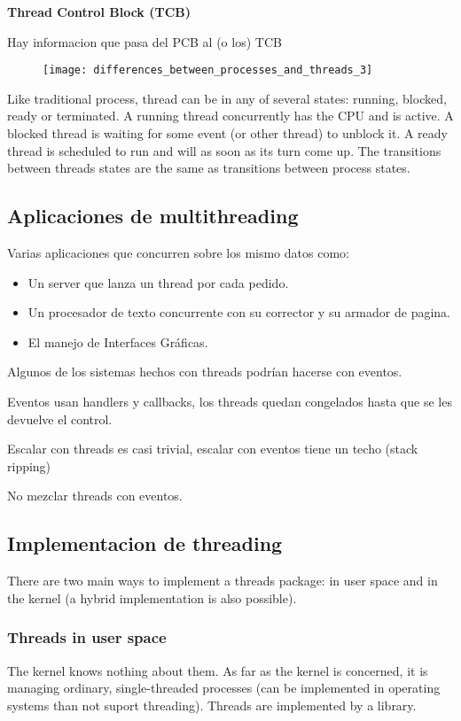 \documentclass[a4paper, twoside]{article}
\begin{document}
\textbf{Thread Control Block (TCB)}

Hay informacion que pasa del PCB al (o los) TCB

\begin{figure}[H]
	\centering
	\texttt{[image: differences\_between\_processes\_and\_threads\_3]}
	\label{fig:differences_between_processes_and_threads_3}
\end{figure}

Like traditional process, thread can be in any of several states: running, blocked, ready or terminated. A running thread concurrently has the CPU and is active. A blocked thread is waiting for some event (or other thread) to unblock it. A ready thread is scheduled to run and will as soon as its turn come up. The transitions between threads states are the same as transitions between process states.

\subsection{Aplicaciones de multithreading}
Varias aplicaciones que concurren sobre los mismo datos como:
\begin{itemize}
	\item Un server que lanza un thread por cada pedido.
	\item Un procesador de texto concurrente con su corrector y su armador de pagina.
	\item El manejo de Interfaces Gráficas.
\end{itemize}

Algunos de los sistemas hechos con threads podrían hacerse con eventos.

Eventos usan handlers y callbacks, los threads quedan congelados hasta que se les devuelve el control.

Escalar con threads es casi trivial, escalar con eventos tiene un techo (stack ripping) 

No mezclar threads con eventos.

\subsection{Implementacion de threading}
There are two main ways to implement a threads package: in user space and in the kernel (a hybrid implementation is also possible).

\subsubsection{Threads in user space}
The kernel knows nothing about them. As far as the kernel is concerned, it is managing ordinary, single-threaded processes (can be implemented in operating systems than not suport threading). Threads are implemented by a library.
\end{document}
